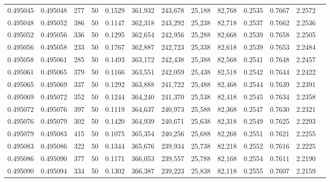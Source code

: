 \begin{tabular}{rrrrrrrrrrrrr}
0.495045 & 0.495048 &   277 &  50 &                                     0.1529 & 361,932 & 243,678 &  25,188 &  82,768 & 0.2535 & 0.7667 & 2.2572 \\
0.495048 & 0.495052 &   386 &  50 &                                     0.1147 & 362,318 & 243,292 &  25,238 &  82,718 & 0.2537 & 0.7662 & 2.2536 \\
0.495052 & 0.495056 &   336 &  50 &                                     0.1295 & 362,654 & 242,956 &  25,288 &  82,668 & 0.2539 & 0.7658 & 2.2505 \\
0.495056 & 0.495058 &   233 &  50 &                                     0.1767 & 362,887 & 242,723 &  25,338 &  82,618 & 0.2539 & 0.7653 & 2.2484 \\
0.495058 & 0.495061 &   285 &  50 &                                     0.1493 & 363,172 & 242,438 &  25,388 &  82,568 & 0.2541 & 0.7648 & 2.2457 \\
0.495061 & 0.495065 &   379 &  50 &                                     0.1166 & 363,551 & 242,059 &  25,438 &  82,518 & 0.2542 & 0.7644 & 2.2422 \\
0.495065 & 0.495069 &   337 &  50 &                                     0.1292 & 363,888 & 241,722 &  25,488 &  82,468 & 0.2544 & 0.7639 & 2.2391 \\
0.495069 & 0.495072 &   352 &  50 &                                     0.1244 & 364,240 & 241,370 &  25,538 &  82,418 & 0.2545 & 0.7634 & 2.2358 \\
0.495072 & 0.495076 &   397 &  50 &                                     0.1119 & 364,637 & 240,973 &  25,588 &  82,368 & 0.2547 & 0.7630 & 2.2321 \\
0.495076 & 0.495079 &   302 &  50 &                                     0.1420 & 364,939 & 240,671 &  25,638 &  82,318 & 0.2549 & 0.7625 & 2.2293 \\
0.495079 & 0.495083 &   415 &  50 &                                     0.1075 & 365,354 & 240,256 &  25,688 &  82,268 & 0.2551 & 0.7621 & 2.2255 \\
0.495083 & 0.495086 &   322 &  50 &                                     0.1344 & 365,676 & 239,934 &  25,738 &  82,218 & 0.2552 & 0.7616 & 2.2225 \\
0.495086 & 0.495090 &   377 &  50 &                                     0.1171 & 366,053 & 239,557 &  25,788 &  82,168 & 0.2554 & 0.7611 & 2.2190 \\
0.495090 & 0.495094 &   334 &  50 &                                     0.1302 & 366,387 & 239,223 &  25,838 &  82,118 & 0.2555 & 0.7607 & 2.2159 \\

\end{tabular}

